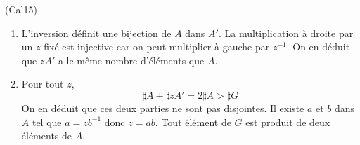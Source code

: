\begin{tiny}(Cal15)\end{tiny}
\begin{enumerate}
 \item L'inversion définit une bijection de $A$ dans $A'$. La multiplication à droite par un $z$ fixé est injective car on peut multiplier à gauche par $z^{-1}$. On en déduit que $zA'$ a le même nombre d'éléments que $A$.
 \item Pour tout $z$,
\begin{displaymath}
 \sharp A + \sharp zA' = 2\sharp A > \sharp G
\end{displaymath}
On en déduit que ces deux parties ne sont pas disjointes. Il existe $a$ et $b$ dans $A$ tel que $a=zb^{-1}$ donc $z=ab$. Tout élément de $G$ est produit de deux éléments de $A$.
\end{enumerate}
